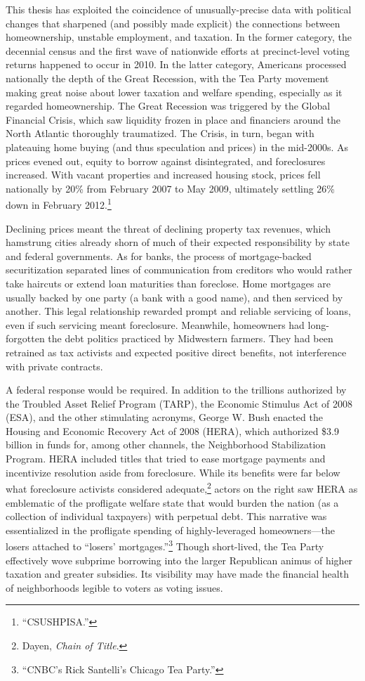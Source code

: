 \documentclass[12pt,oneside]{psthesis}
\begin{document}
This thesis has exploited the coincidence of unusually-precise data with political changes that sharpened (and possibly made explicit) the connections between homeownership, unstable employment, and taxation.
In the former category, the decennial census and the first wave of nationwide efforts at precinct-level voting returns happened to occur in 2010.
In the latter category, Americans processed nationally the depth of the Great Recession, with the Tea Party movement making great noise about lower taxation and welfare spending, especially as it regarded homeownership.
The Great Recession was triggered by the Global Financial Crisis, which saw liquidity frozen in place and financiers around the North Atlantic thoroughly traumatized.
The Crisis, in turn, began with plateauing home buying (and thus speculation and prices) in the mid-2000s.
As prices evened out, equity to borrow against disintegrated, and foreclosures increased.
With vacant properties and increased housing stock, prices fell nationally by 20\% from February 2007 to May 2009, ultimately settling 26\% down in February 2012.\footnote{``CSUSHPISA.''}

Declining prices meant the threat of declining property tax revenues, which hamstrung cities already shorn of much of their expected responsibility by state and federal governments.
As for banks, the process of mortgage-backed securitization separated lines of communication from creditors who would rather take haircuts or extend loan maturities than foreclose.
Home mortgages are usually backed by one party (a bank with a good name), and then serviced by another.
This legal relationship rewarded prompt and reliable servicing of loans, even if such servicing meant foreclosure.
Meanwhile, homeowners had long-forgotten the debt politics practiced by Midwestern farmers.
They had been retrained as tax activists and expected positive direct benefits, not interference with private contracts.

A federal response would be required.
In addition to the trillions authorized by the Troubled Asset Relief Program (TARP), the Economic Stimulus Act of 2008 (ESA), and the other stimulating acronyms, George W. Bush enacted the Housing and Economic Recovery Act of 2008 (HERA), which authorized \$3.9 billion in funds for, among other channels, the Neighborhood Stabilization Program.
HERA included titles that tried to ease mortgage payments and incentivize resolution aside from foreclosure.
While its benefits were far below what foreclosure activists considered adequate,\footnote{Dayen, \emph{Chain of Title}.} actors on the right saw HERA as emblematic of the profligate welfare state that would burden the nation (as a collection of individual taxpayers) with perpetual debt.
This narrative was essentialized in the profligate spending of highly-leveraged homeowners---the losers attached to ``losers' mortgages.''\footnote{``CNBC's Rick Santelli's Chicago Tea Party.''}
Though short-lived, the Tea Party effectively wove subprime borrowing into the larger Republican animus of higher taxation and greater subsidies.
Its visibility may have made the financial health of neighborhoods legible to voters as voting issues.
\end{document}
